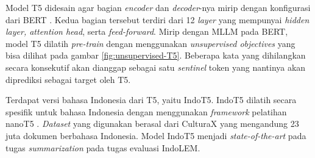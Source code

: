 Model T5 didesain agar bagian \textit{encoder} dan \textit{decoder}-nya mirip dengan konfigurasi dari BERT \parencite{T5}. Kedua bagian tersebut terdiri dari 12 \textit{layer} yang mempunyai \textit{hidden layer, attention head}, serta \textit{feed-forward}. Mirip dengan MLLM pada BERT, model T5 dilatih \textit{pre-train} dengan menggunakan \textit{unsupervised objectives} yang bisa dilihat pada gambar \ref{fig:unsupervised-T5}. Beberapa kata yang dihilangkan secara konsekutif akan dianggap sebagai satu \textit{sentinel} token yang nantinya akan diprediksi sebagai target oleh T5.

Terdapat versi bahasa Indonesia dari T5, yaitu IndoT5. IndoT5 dilatih secara spesifik untuk bahasa Indonesia dengan menggunakan \textit{framework} pelatihan nanoT5 \parencite{indoT5}. \textit{Dataset} yang digunakan berasal dari CulturaX yang mengandung 23 juta dokumen berbahasa Indonesia. Model IndoT5 menjadi \textit{state-of-the-art} pada tugas \textit{summarization} pada tugas evaluasi IndoLEM.

